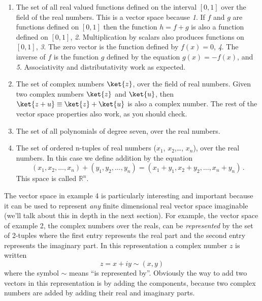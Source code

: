 \begin{enumerate}
\item The set of all real valued functions defined on the interval $[0, 1]$ over the field of the real numbers.
This is a vector space because \emph{1}. If $f$ and $g$ are functions defined on $[0, 1]$ then the function $h = f + g$ is also a function defined on $[0, 1]$, \emph{2}. Multiplication by scalars also produces functions on $[0, 1]$, \emph{3}. The zero vector is the function defined by $f(x)=0$, \emph{4}. The inverse of $f$ is the function $g$ defined by the equation $g(x) = -f(x)$, and \emph{5}. Associativity and distributativity work as expected.
\item The set of complex numbers $\ket{z}$, over the field of real numbers.
Given two complex numbers $\ket{z}$ and $\ket{u}$, then $\ket{z+u} \equiv \ket{z} + \ket{u}$ is also a complex number.
The rest of the vector space properties also work, as you should check.
\item The set of all polynomials of degree seven, over the real numbers.
\item The set of ordered n-tuples of real numbers ($x_1$, $x_2$,\ldots , $x_n$), over the real numbers.
In this case we define addition by the equation
\begin{equation*}
(x_1, x_2, \ldots, x_n) + (y_1, y_2, \ldots, y_n) = (x_1 + y_1, x_2 + y_2, \ldots, x_n + y_n) \, .
\end{equation*}
This space is called $\mathbb{R}^n$.
\end{enumerate}
The vector space in example 4 is particularly interesting and important because it can be used to represent \emph{any} finite dimensional real vector space imaginable (we'll talk about this in depth in the next section).
For example, the vector space of example 2, the complex numbers over the reals, can be \emph{represented} by the set of 2-tuples where the first entry represents the real part and the second entry represents the imaginary part.
In this representation a complex number $z$ is written
\begin{equation*}
z = x + iy \sim (x,y)
\end{equation*}
where the symbol $\sim$ means ``is represented by''.
Obviously the way to add two vectors in this representation is by adding the components, because two complex numbers are added by adding their real and imaginary parts.

